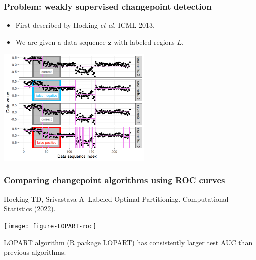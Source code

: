 \documentclass[t]{beamer}
\begin{document}
\begin{frame}
  \frametitle{Problem: weakly supervised changepoint detection}
  \begin{itemize}
  \item First described by Hocking \emph{et al.} ICML 2013.
  \item We are given a data sequence $\mathbf z$ with labeled regions
    $L$.
  \end{itemize}

  \includegraphics[width=0.56\textwidth]{figure-fn-not-monotonic}


\end{frame}

\begin{frame}
  \frametitle{Comparing changepoint algorithms using ROC curves}
  Hocking TD, Srivastava A. Labeled Optimal
  Partitioning. Computational Statistics (2022).
  
  \texttt{[image: figure-LOPART-roc]}

  LOPART algorithm (R package LOPART) has consistently larger
  test AUC than previous algorithms.
\end{frame}
\end{document}

